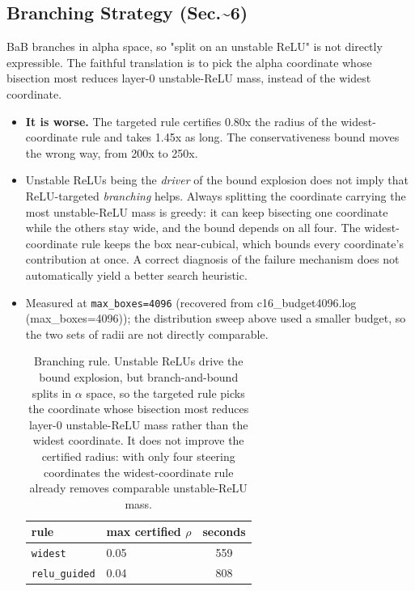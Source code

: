\documentclass[10pt,journal]{IEEEtran}
\begin{document}
\subsection{Branching Strategy (Sec.\textasciitilde{}6)}
BaB branches in alpha space, so "split on an unstable ReLU" is not directly expressible. The faithful translation is to pick the alpha coordinate whose bisection most reduces layer-0 unstable-ReLU mass, instead of the widest coordinate.
\begin{itemize}
\item \textbf{It is worse.} The targeted rule certifies 0.80x the radius of the widest-coordinate rule and takes 1.45x as long. The conservativeness bound moves the wrong way, from 200x to 250x.
\item Unstable ReLUs being the \emph{driver} of the bound explosion does not imply that ReLU-targeted \emph{branching} helps. Always splitting the coordinate carrying the most unstable-ReLU mass is greedy: it can keep bisecting one coordinate while the others stay wide, and the bound depends on all four. The widest-coordinate rule keeps the box near-cubical, which bounds every coordinate's contribution at once. A correct diagnosis of the failure mechanism does not automatically yield a better search heuristic.
\item Measured at \texttt{max\_boxes=4096} (recovered from c16\_budget4096.log (max\_boxes=4096)); the distribution sweep above used a smaller budget, so the two sets of radii are not directly comparable.

\begin{table}[t]
\centering
\caption{Branching rule. Unstable ReLUs drive the bound explosion, but branch-and-bound splits in $\alpha$ space, so the targeted rule picks the coordinate whose bisection most reduces layer-0 unstable-ReLU mass rather than the widest coordinate. It does not improve the certified radius: with only four steering coordinates the widest-coordinate rule already removes comparable unstable-ReLU mass.}
\label{tab:branching}
\begin{tabular}{l l S[table-format=4.0]}
\toprule
rule & {max certified $\rho$} & {seconds} \\
\midrule
\texttt{widest} & 0.05 & 559 \\
\texttt{relu\_guided} & 0.04 & 808 \\
\bottomrule
\end{tabular}
\end{table}

\end{itemize}
\end{document}

